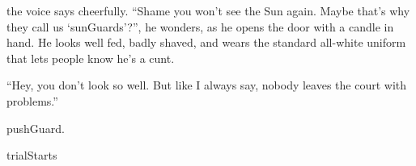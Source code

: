 the voice says cheerfully.
``Shame you won't see the Sun again.
Maybe that's why they call us `\glspl{sunGuard}'?'', he wonders, as he opens the door with a candle in hand.
He looks well fed, badly shaved, and wears the standard all-white uniform that lets people know he's a cunt.

``Hey, you don't look so well.
But like I always say, nobody leaves the \gls{court} with problems.''

\begin{selectPath}
  {}%
  {pushGuard}.

   {}%
   {trialStarts}
\end{selectPath}
